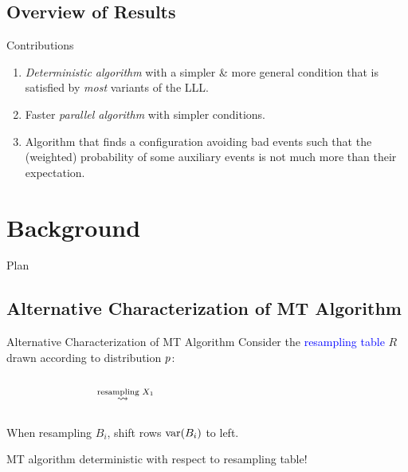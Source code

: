 \documentclass{beamer}
\def\padding{\vspace{0.5cm}}
\def\spadding{\vspace{0.25cm}}
\def\b{\textcolor{blue}}
\begin{document}
\subsection{Overview of Results}
\begin{frame}{Contributions}
\begin{enumerate}
    \item \emph{Deterministic algorithm} with a simpler \& more general condition that is satisfied by \emph{most} variants of the LLL.\pause
    \item Faster \emph{parallel algorithm} with simpler conditions.\pause
    \item Algorithm that finds a configuration avoiding bad events such that the (weighted) probability of some auxiliary events is not much more than their expectation.
\end{enumerate}
\end{frame}

\section{Background}
\begin{frame}{Plan}
\tableofcontents[currentsection, sectionstyle=show/shaded, hideothersubsections]
\end{frame}

\subsection{Alternative Characterization of MT Algorithm}
\begin{frame}{Alternative Characterization of MT Algorithm}
Consider the \b{resampling table} $R$ drawn according to distribution $p$:\spadding

\begin{columns}
\begin{column}{.25\textwidth}
\vspace{0.15em}\pause
\end{column}\pause
\begin{column}{.1\textwidth}
\centering $\overset{\text{resampling $X_1$}}{\rightsquigarrow\hspace{0.5em}}$
\end{column}
\begin{column}{.3\textwidth}

\end{column}
\begin{column}{.05\textwidth}
\end{column}
\end{columns}\pause

When resampling $B_i$, shift rows $\mathrm{var}(B_i)$ to left.\pause\padding

\follows MT algorithm deterministic with respect to resampling table!
\end{frame}
\end{document}
